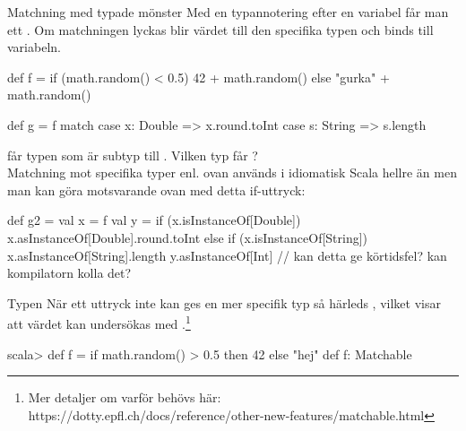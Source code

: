 \begin{Slide}{Matchning med typade mönster}\SlideFontSmall
Med en typannotering efter en variabel får man ett  . Om matchningen lyckas blir värdet  till den specifika typen och binds till variabeln.
\begin{Code}
def f = 
  if (math.random() < 0.5) 42 + math.random() else "gurka" + math.random()

def g = f match 
  case x: Double => x.round.toInt
  case s: String => s.length
\end{Code}
 får typen  som är subtyp till . Vilken typ får ? \pause ~~\\
Matchning mot specifika typer enl. ovan används i idiomatisk Scala hellre än  men man kan göra motsvarande ovan med detta if-uttryck:
\begin{Code}
def g2 =  
  val x = f
  val y = 
    if (x.isInstanceOf[Double]) x.asInstanceOf[Double].round.toInt
    else if (x.isInstanceOf[String]) x.asInstanceOf[String].length
  y.asInstanceOf[Int] // kan detta ge körtidsfel? kan kompilatorn kolla det?
\end{Code}
\end{Slide}

\begin{Slide}{Typen }
När ett uttryck inte kan ges en mer specifik typ så härleds , vilket visar att värdet kan undersökas med .\footnote{Mer detaljer om varför  behövs här: https://dotty.epfl.ch/docs/reference/other-new-features/matchable.html}
\begin{REPLnonum}
scala> def f = if math.random() > 0.5 then 42 else "hej"
def f: Matchable
\end{REPLnonum}
\end{Slide}

